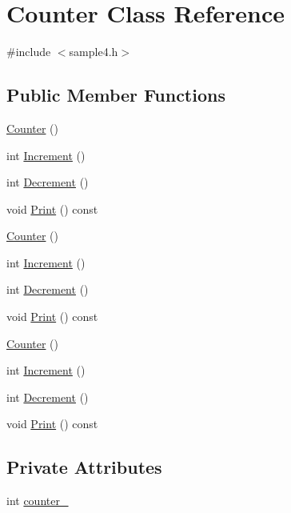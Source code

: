 \hypertarget{class_counter}{}\section{Counter Class Reference}
\label{class_counter}


{\ttfamily \#include $<$sample4.\+h$>$}

\subsection*{Public Member Functions}
\begin{DoxyCompactItemize}
\item 
\mbox{\hyperlink{class_counter_a1e05f69b5240fbab3e7ab351672167f0}{Counter}} ()
\item 
int \mbox{\hyperlink{class_counter_a0a0ca9fdb580a2aec9a5a62ebed2b5ab}{Increment}} ()
\item 
int \mbox{\hyperlink{class_counter_aa58d9b4f0bd96fc2331234493eb21bed}{Decrement}} ()
\item 
void \mbox{\hyperlink{class_counter_a80092ec2a0deea0870b2e9f8ad0906bd}{Print}} () const
\item 
\mbox{\hyperlink{class_counter_a1e05f69b5240fbab3e7ab351672167f0}{Counter}} ()
\item 
int \mbox{\hyperlink{class_counter_a0a0ca9fdb580a2aec9a5a62ebed2b5ab}{Increment}} ()
\item 
int \mbox{\hyperlink{class_counter_aa58d9b4f0bd96fc2331234493eb21bed}{Decrement}} ()
\item 
void \mbox{\hyperlink{class_counter_a80092ec2a0deea0870b2e9f8ad0906bd}{Print}} () const
\item 
\mbox{\hyperlink{class_counter_a1e05f69b5240fbab3e7ab351672167f0}{Counter}} ()
\item 
int \mbox{\hyperlink{class_counter_a0a0ca9fdb580a2aec9a5a62ebed2b5ab}{Increment}} ()
\item 
int \mbox{\hyperlink{class_counter_aa58d9b4f0bd96fc2331234493eb21bed}{Decrement}} ()
\item 
void \mbox{\hyperlink{class_counter_a80092ec2a0deea0870b2e9f8ad0906bd}{Print}} () const
\end{DoxyCompactItemize}
\subsection*{Private Attributes}
\begin{DoxyCompactItemize}
\item 
int \mbox{\hyperlink{class_counter_abdef0bf73f0a68177863c42c6eba2fc0}{counter\+\_\+}}
\end{DoxyCompactItemize}


